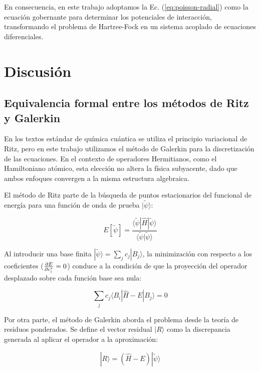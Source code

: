 \documentclass[12pt, a4paper, oneside, spanish]{book}
\begin{document}
En consecuencia, en este trabajo adoptamos la Ec. (\cref{eq:poisson-radial}) como la ecuación gobernante para determinar los potenciales de interacción, transformando el problema de Hartree-Fock en un sistema acoplado de ecuaciones diferenciales.

\section{Discusión}

\subsection{Equivalencia formal entre los métodos de Ritz y Galerkin}

En los textos estándar de química cuántica se utiliza el principio variacional de Ritz, pero en este trabajo utilizamos el método de Galerkin para la discretización de las ecuaciones. En el contexto de operadores Hermitianos, como el Hamiltoniano atómico, esta elección no altera la física subyacente, dado que ambos enfoques convergen a la misma estructura algebraica.

El método de Ritz parte de la búsqueda de puntos estacionarios del funcional de energía para una función de onda de prueba $|\tilde{\psi}\rangle$:

\begin{equation}
    E[\tilde{\psi}] = \frac{\langle \tilde{\psi} | \hat{H} | \tilde{\psi} \rangle}{\langle \tilde{\psi} | \tilde{\psi} \rangle}
\end{equation}

Al introducir una base finita $|\tilde{\psi}\rangle = \displaystyle\sum_{j} c_j |B_j\rangle$, la minimización con respecto a los coeficientes ($\pdv{E}{c_i^{*}} = 0$) conduce a la condición de que la proyección del operador desplazado sobre cada función base sea nula:

\begin{equation}
    \label{eq:ritz_condition}
    \sum_{j} c_j \langle B_i | \hat{H} - E | B_j \rangle = 0
\end{equation}

Por otra parte, el método de Galerkin aborda el problema desde la teoría de residuos ponderados. Se define el vector residual $|R\rangle$ como la discrepancia generada al aplicar el operador a la aproximación:

\begin{equation}
    |R\rangle = (\hat{H} - E) |\tilde{\psi}\rangle
\end{equation}
\end{document}
